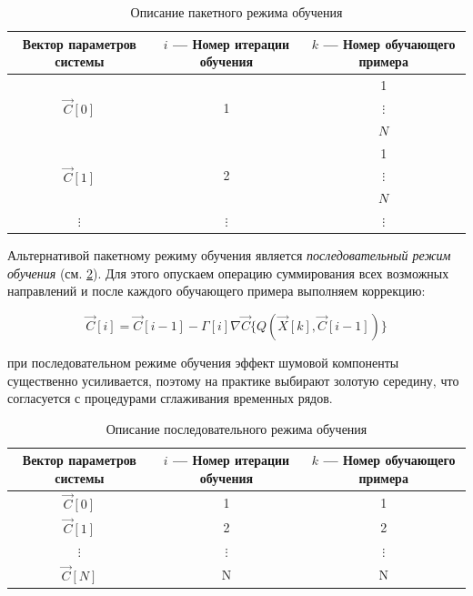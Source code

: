 \documentclass{article}
\numberwithin{equation}{subsection}
\begin{document}
\begin{table}[htbp]
    \centering
    \caption{Описание пакетного режима обучения}
    \label{table:packet_training}
    \begin{tabular}{c | c | c}
        Вектор параметров системы     & $i$ --- Номер итерации обучения & $k$ --- Номер обучающего примера \\\hline
        \multirow{3}{*}{$\vec{C}[0]$} & \multirow{3}{*}{1}  & 1 \\\cline{3-3}
                                      &                     & $\vdots$\\\cline{3-3}
                                      &                     & $N$ \\\hline
        \multirow{3}{*}{$\vec{C}[1]$} & \multirow{3}{*}{2}  & 1 \\\cline{3-3}
                                      &                     & $\vdots$\\\cline{3-3}
                                      &                     & $N$ \\\hline
        $\vdots$                      & $\vdots$            & $\vdots$ \\\hline
    \end{tabular}
\end{table}

Альтернативой пакетному режиму обучения является \textit{последовательный режим обучения}
(см. \ref{table:seq_training}).
Для этого опускаем операцию суммирования всех возможных направлений и после каждого
обучающего примера выполняем коррекцию:

\begin{equation}
    \vec{C}[i] = \vec{C}[i-1] - \Gamma[i] \nabla\vec{C} \{ Q(\vec{X}[k], \vec{C}[i-1]) \}
\end{equation}

при последовательном режиме обучения эффект шумовой компоненты существенно 
усиливается, поэтому на практике выбирают \glqq золотую середину\grqq, что
согласуется с процедурами сглаживания временных рядов.

\begin{table}[htbp]
    \centering
    \caption{Описание последовательного режима обучения}
    \label{table:seq_training}
    \begin{tabular}{c | c | c}
        Вектор параметров системы     & $i$ --- Номер итерации обучения & $k$ --- Номер обучающего примера \\\hline
        $\vec{C}[0]$                  & 1                   & 1 \\\hline
        $\vec{C}[1]$                  & 2                   & 2 \\\hline
        $\vdots$                      & $\vdots$            & $\vdots$\\\hline
        $\vec{C}[N]$                  & N                   & N \\\hline
    \end{tabular}
\end{table}
\end{document}
